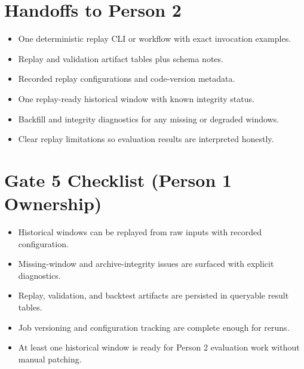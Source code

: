 \documentclass{article}
\begin{document}
\section*{Handoffs to Person 2}
\begin{itemize}
\item One deterministic replay CLI or workflow with exact invocation examples.
\item Replay and validation artifact tables plus schema notes.
\item Recorded replay configurations and code-version metadata.
\item One replay-ready historical window with known integrity status.
\item Backfill and integrity diagnostics for any missing or degraded windows.
\item Clear replay limitations so evaluation results are interpreted honestly.
\end{itemize}

\section*{Gate 5 Checklist (Person 1 Ownership)}
\begin{itemize}
\item Historical windows can be replayed from raw inputs with recorded configuration.
\item Missing-window and archive-integrity issues are surfaced with explicit diagnostics.
\item Replay, validation, and backtest artifacts are persisted in queryable result tables.
\item Job versioning and configuration tracking are complete enough for reruns.
\item At least one historical window is ready for Person 2 evaluation work without manual patching.
\end{itemize}
\end{document}
